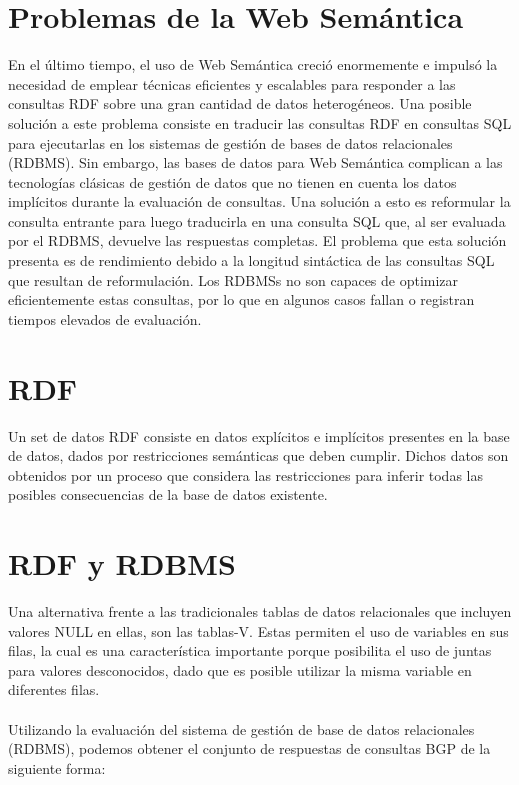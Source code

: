 \documentclass[10pt,a4paper]{article}
\begin{document}
\newpage
\section{Problemas de la Web Semántica}
En el último tiempo, el uso de Web Semántica creció enormemente e impulsó la necesidad de emplear técnicas eficientes y escalables para responder a las consultas RDF sobre una gran cantidad de datos heterogéneos. Una posible solución a este problema consiste en traducir las consultas RDF en consultas SQL para ejecutarlas en los sistemas de gestión de bases de datos relacionales (RDBMS). Sin embargo, las bases de datos para Web Semántica complican a las tecnologías clásicas de gestión de datos que no tienen en cuenta los datos implícitos durante la evaluación de consultas. Una solución a esto es reformular la consulta entrante para luego traducirla en una consulta SQL que, al ser evaluada por el RDBMS, devuelve las respuestas completas. El problema que esta solución presenta es de rendimiento debido a la longitud sintáctica de las consultas SQL que resultan de reformulación. Los RDBMSs no son capaces de optimizar eficientemente estas consultas, por lo que en algunos casos fallan o registran tiempos elevados de evaluación.

\newpage
\section{RDF}
Un set de datos RDF consiste en datos explícitos e implícitos presentes en la base de datos, dados por restricciones semánticas que deben cumplir. Dichos datos son obtenidos por un proceso que considera las restricciones para inferir todas las posibles consecuencias de la base de datos existente.

\newpage

\section{RDF y RDBMS}
Una alternativa frente a las tradicionales tablas de datos relacionales que incluyen valores NULL en ellas, son las tablas-V. Estas permiten el uso de variables en sus filas, la cual es una característica importante porque posibilita el uso de juntas para valores desconocidos, dado que es posible utilizar la misma variable en diferentes filas.
\\\\
Utilizando la evaluación del sistema de gestión de base de datos relacionales (RDBMS), podemos obtener el conjunto de respuestas de consultas BGP de la siguiente forma:
\end{document}
